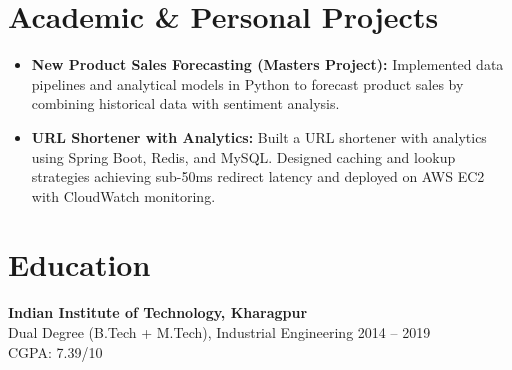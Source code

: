 \documentclass[10pt,a4paper]{article}
\begin{document}
\section*{Academic \& Personal Projects}
\begin{itemize}[leftmargin=*]
    \item \textbf{New Product Sales Forecasting (Masters Project):} Implemented data pipelines and analytical models in Python to forecast product sales by combining historical data with sentiment analysis.
    \item \textbf{URL Shortener with Analytics:} Built a URL shortener with analytics using Spring Boot, Redis, and MySQL. Designed caching and lookup strategies achieving sub-50ms redirect latency and deployed on AWS EC2 with CloudWatch monitoring.
\end{itemize}


\section*{Education}
\textbf{Indian Institute of Technology, Kharagpur}  \\
Dual Degree (B.Tech + M.Tech), Industrial Engineering \hfill 2014 -- 2019 \\
CGPA: 7.39/10
\end{document}
